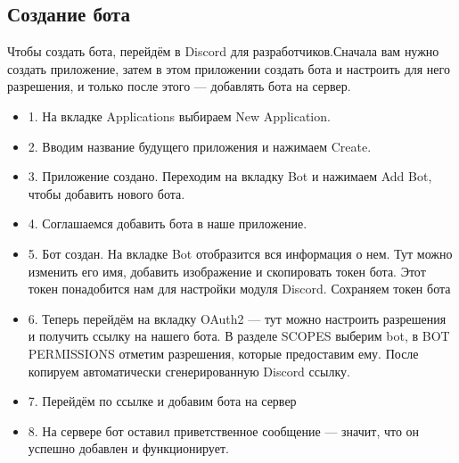 \documentclass[a4paper,12pt]{article}
\begin{document}
\subsection{Создание бота}
Чтобы создать бота, перейдём в Discord для разработчиков.Сначала вам нужно создать приложение, затем в этом приложении создать бота и настроить для него разрешения, и только после этого — добавлять бота на сервер. \\
\begin{itemize}
    \item 1. На вкладке Applications выбираем New Application.
    \item 2. Вводим название будущего приложения и нажимаем Create.
    \item 3. Приложение создано. Переходим на вкладку Bot и нажимаем Add Bot, чтобы добавить нового бота.
    \item 4. Соглашаемся добавить бота в наше приложение.
    \item 5. Бот создан. На вкладке Bot отобразится вся информация о нем. Тут можно изменить его имя, добавить изображение и скопировать токен бота. Этот токен понадобится нам для настройки модуля Discord.
    Сохраняем токен бота
    \item 6. Теперь перейдём на вкладку OAuth2 — тут можно настроить разрешения и получить ссылку на нашего бота. В разделе SCOPES выберим bot, в BOT PERMISSIONS отметим разрешения, которые предоставим ему. После  копируем автоматически сгенерированную Discord ссылку.
    \item 7. Перейдём по ссылке и добавим бота на сервер
    \item 8. На сервере бот оставил приветственное сообщение — значит, что он успешно добавлен и функционирует.
\end{itemize}
\noindent
\end{document}

